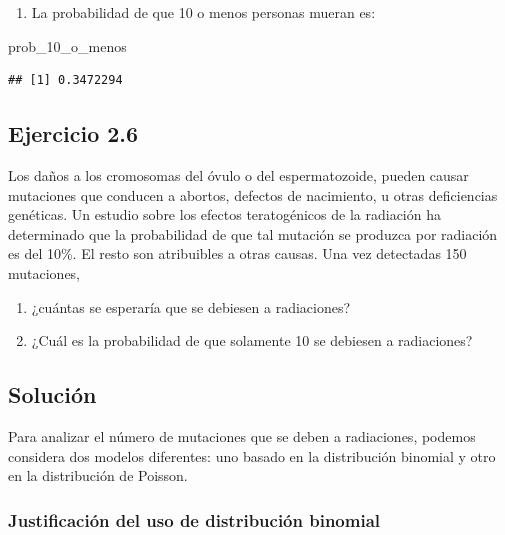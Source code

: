 \documentclass[
]{article}
\newenvironment{Shaded}{\begin{snugshade}}{\end{snugshade}}
\newcommand{\NormalTok}[1]{#1}
\providecommand{\tightlist}{%
  \setlength{\itemsep}{0pt}\setlength{\parskip}{0pt}}
\begin{document}
\begin{enumerate}
\def\labelenumi{\arabic{enumi}.}
\setcounter{enumi}{2}
\tightlist
\item
  La probabilidad de que 10 o menos personas mueran es:
\end{enumerate}

\begin{Shaded}
\begin{Highlighting}[]
\NormalTok{prob\_10\_o\_menos}
\end{Highlighting}
\end{Shaded}

\begin{verbatim}
## [1] 0.3472294
\end{verbatim}

\subsection{Ejercicio 2.6}\label{ejercicio-2.6}

Los daños a los cromosomas del óvulo o del espermatozoide, pueden causar mutaciones que conducen a abortos, defectos de nacimiento, u otras deficiencias genéticas. Un estudio sobre los efectos teratogénicos de la radiación ha determinado que la probabilidad de que tal mutación se produzca por radiación es del 10\%. El resto son atribuibles a otras causas.
Una vez detectadas 150 mutaciones,

\begin{enumerate}
\def\labelenumi{\arabic{enumi}.}
\tightlist
\item
  ¿cuántas se esperaría que se debiesen a radiaciones?
\item
  ¿Cuál es la probabilidad de que solamente 10 se debiesen a radiaciones?
\end{enumerate}

\subsection{Solución}\label{soluciuxf3n-5}

Para analizar el número de mutaciones que se deben a radiaciones, podemos considera dos modelos diferentes: uno basado en la distribución binomial y otro en la distribución de Poisson.

\subsubsection{Justificación del uso de distribución binomial}\label{justificaciuxf3n-del-uso-de-distribuciuxf3n-binomial}
\end{document}
